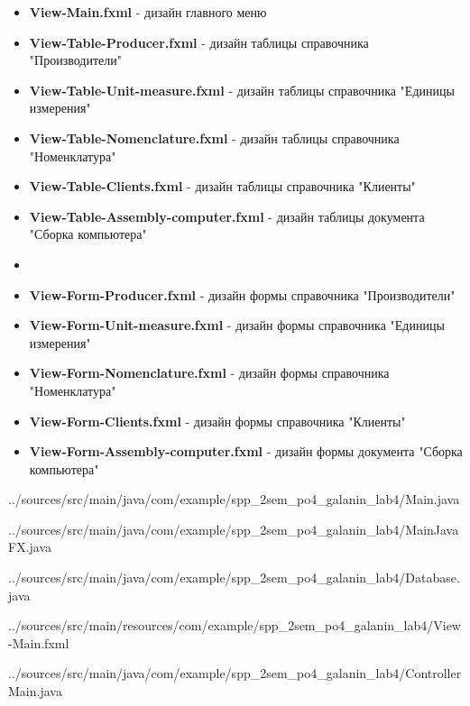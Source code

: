 \documentclass[12pt, a4paper, simple]{eskdtext}
\begin{document}
    \begin{itemize}
        \item \textbf{View-Main.fxml} - дизайн главного меню
        \item \textbf{View-Table-Producer.fxml} - дизайн таблицы справочника "Производители"
        \item \textbf{View-Table-Unit-measure.fxml} - дизайн таблицы справочника "Единицы измерения"
        \item \textbf{View-Table-Nomenclature.fxml} - дизайн таблицы справочника "Номенклатура"
        \item \textbf{View-Table-Clients.fxml} - дизайн таблицы справочника "Клиенты"
        \item \textbf{View-Table-Assembly-computer.fxml} - дизайн таблицы документа "Сборка компьютера"
        \item[] \hspace{0pt}
        \item \textbf{View-Form-Producer.fxml} - дизайн формы справочника "Производители"
        \item \textbf{View-Form-Unit-measure.fxml} - дизайн формы справочника "Единицы измерения"
        \item \textbf{View-Form-Nomenclature.fxml} - дизайн формы справочника "Номенклатура"
        \item \textbf{View-Form-Clients.fxml} - дизайн формы справочника "Клиенты"
        \item \textbf{View-Form-Assembly-computer.fxml} - дизайн формы документа "Сборка компьютера"
    \end{itemize}

    
    {../sources/src/main/java/com/example/spp_2sem_po4_galanin_lab4/Main.java}

    
    {../sources/src/main/java/com/example/spp_2sem_po4_galanin_lab4/MainJavaFX.java}


    
    {../sources/src/main/java/com/example/spp_2sem_po4_galanin_lab4/Database.java}


    
    {../sources/src/main/resources/com/example/spp_2sem_po4_galanin_lab4/View-Main.fxml}

    
    {../sources/src/main/java/com/example/spp_2sem_po4_galanin_lab4/ControllerMain.java}
\end{document}
